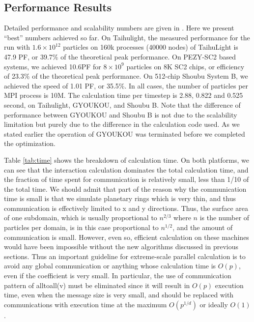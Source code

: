   
\subsection{Performance Results}

Detailed performance and scalability numbers are given in
\cite{v2plus,Iwasawaetal2019barxive}. Here we present ``best'' numbers achieved so far.
On Taihulight,
the measured performance for the run with $1.6\times 10^{12}$ particles on 160k
processes (40000 nodes) of TaihuLight is 47.9 PF, or 39.7\% of the
theoretical peak performance.  On
PEZY-SC2 based systems, we achieved 10.6PF for $8\times 10^{9}$
particles on 8K SC2 chips, or efficiency of 23.3\% of the theoretical
peak performance. On 512-chip Shoubu System B, we achieved the speed
of 1.01 PF, or 35.5\%.  In all cases, the number of particles per MPI
process is 10M. The calculation time per timestep is 2.88, 0.822 and
0.525 second, on Taihulight, GYOUKOU, and Shoubu B. Note that the
difference of performance between GYOUKOU and Shoubu B is not due to
the scalability limitation but purely due to the difference in the
calculation code used. As we stated earlier the operation of GYOUKOU
was terminated before we completed the optimization.


Table \ref{tab:time} shows the breakdown of calculation time. On both
platforms, we can see that the interaction calculation dominates the
total calculation time, and the fraction of time spent for
communication is relatively small, less than 1/10 of the total time.
We should admit that part of the reason why the communication time is
small is that we simulate planetary rings which is very thin, and thus
communication is effectively limited to x and y directions. Thus, the
surface area of one subdomain, which is usually proportional to
$n^{2/3}$ where $n$ is the number of particles per domain, is in this
case proportional to $n^{1/2}$, and the amount of communication is
small.  However, even so, efficient calculation on these machines
would have been impossible without the new algorithms discussed in
previous sections. Thus an important guideline for extreme-scale
parallel calculation is to avoid any global communication or anything
whose calculation time is $O(p)$, even if the coefficient is very
small.  In particular, the use of communication pattern of alltoall(v)
must be eliminated since it will result in $O(p)$ execution time, even
when the message size is very small, and should be replaced with
communications with execution time at the maximum $O(p^{1/d})$ or
ideally $O(1)$.



